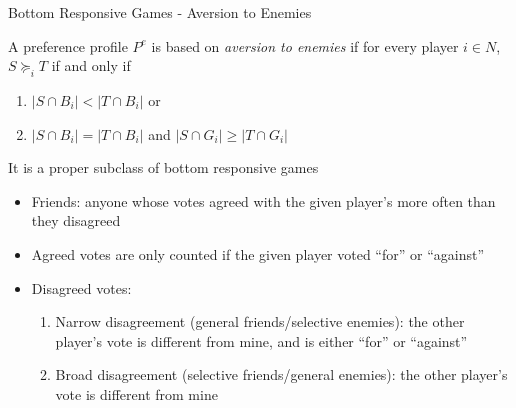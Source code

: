 \documentclass[xcolor=dvipsnames]{beamer}
\begin{document}
\begin{frame}{Bottom Responsive Games - Aversion to Enemies}

  A preference profile $P^e$ is based on \textit{aversion to enemies} if for every
  player $i \in N$, $S \succeq_i T$ if and only if
  \begin{enumerate}
    \item $|S \cap B_i| < |T \cap B_i|$ or
    \item $|S \cap B_i| = |T \cap B_i|$ and $|S \cap G_i| \geq |T \cap G_i|$
  \end{enumerate}
  It is a proper subclass of bottom responsive games

  \begin{itemize}
      \item<only@1> Friends: anyone whose votes agreed with the given player's more often than they disagreed
      \item<only@1> Agreed votes are only counted if the given player voted ``for'' or ``against''
      \item<only@1> Disagreed votes:
      \begin{enumerate}
        \item Narrow disagreement (general friends/selective enemies): the other player's vote is different from mine, and is either ``for'' or ``against''
        \item Broad disagreement (selective friends/general enemies): the other player's vote is different from mine
      \end{enumerate}
  \end{itemize}
\end{frame}
\end{document}
